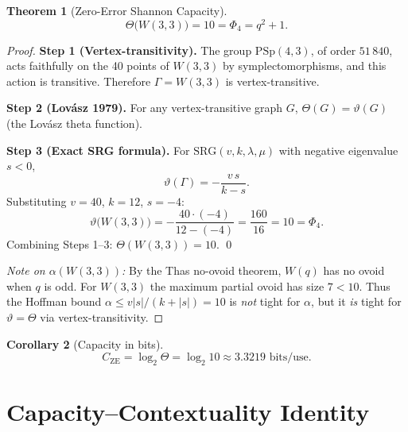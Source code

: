 \documentclass[11pt]{article}
\newtheorem{theorem}{Theorem}[section]
\newtheorem{corollary}[theorem]{Corollary}
\begin{document}
\noindent{}

\begin{theorem}[Zero-Error Shannon Capacity]\label{thm:main}
\[
  \Theta\bigl(W(3,3)\bigr) = 10 = \Phi_4 = q^2+1.
\]
\end{theorem}

\begin{proof}
\textbf{Step 1 (Vertex-transitivity).}
The group $\mathrm{PSp}(4,3)$, of order $51\,840$, acts faithfully on the 40 points
of $W(3,3)$ by symplectomorphisms, and this action is transitive.
Therefore $\Gamma = W(3,3)$ is vertex-transitive.

\textbf{Step 2 (Lov\'asz 1979).}
For any vertex-transitive graph $G$, $\Theta(G) = \vartheta(G)$
(the Lov\'asz theta function).

\textbf{Step 3 (Exact SRG formula).}
For $\mathrm{SRG}(v,k,\lambda,\mu)$ with negative eigenvalue $s < 0$,
\[
  \vartheta(\Gamma) = -\frac{v\,s}{k-s}.
\]
Substituting $v=40$, $k=12$, $s=-4$:
\[
  \vartheta\bigl(W(3,3)\bigr) = -\frac{40\cdot(-4)}{12-(-4)} = \frac{160}{16} = 10 = \Phi_4.
\]
Combining Steps 1--3: $\Theta(W(3,3)) = 10$.  \qed

\emph{Note on $\alpha(W(3,3))$:} By the Thas no-ovoid theorem, $W(q)$ has no ovoid
when $q$ is odd. For $W(3,3)$ the maximum partial ovoid has size $7 < 10$.
Thus the Hoffman bound $\alpha \le v|s|/(k+|s|) = 10$ is \emph{not} tight for $\alpha$,
but it \emph{is} tight for $\vartheta = \Theta$ via vertex-transitivity.
\end{proof}

\begin{corollary}[Capacity in bits]
\[
  C_{\mathrm{ZE}} = \log_2 \Theta = \log_2 10 \approx 3.3219\text{ bits/use.}
\]
\end{corollary}

\section{Capacity--Contextuality Identity}
\end{document}
